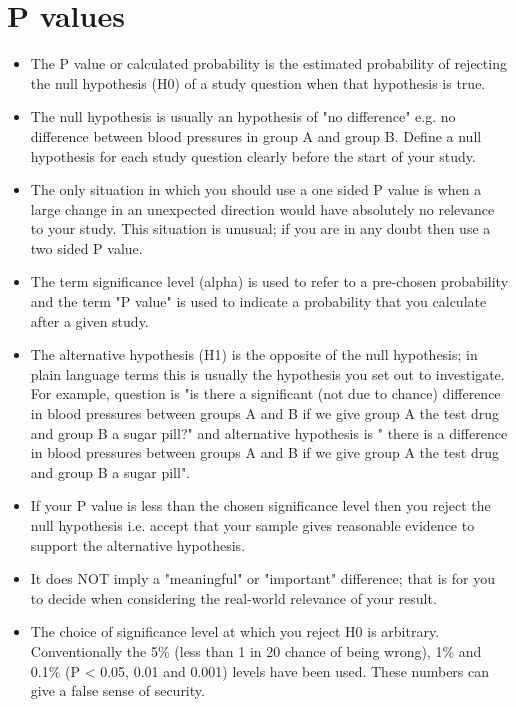 \documentclass[]{report}
\begin{document}
	
\section{P values}

\begin{itemize}
	\item The P value or calculated probability is the estimated probability of rejecting the null hypothesis (H0) of a study question when that hypothesis is true.
	
	\item The null hypothesis is usually an hypothesis of "no difference" e.g. no difference between blood pressures in group A and group B. Define a null hypothesis for each study question clearly before the start of your study.
	
	\item The only situation in which you should use a one sided P value is when a large change in an unexpected direction would have absolutely no relevance to your study. This situation is unusual; if you are in any doubt then use a two sided P value.
	
	\item The term significance level (alpha) is used to refer to a pre-chosen probability and the term "P value" is used to indicate a probability that you calculate after a given study.
	
	\item The alternative hypothesis (H1) is the opposite of the null hypothesis; in plain language terms this is usually the hypothesis you set out to investigate. For example, question is "is there a significant (not due to chance) difference in blood pressures between groups A and B if we give group A the test drug and group B a sugar pill?" and alternative hypothesis is " there is a difference in blood pressures between groups A and B if we give group A the test drug and group B a sugar pill".
	
	
	\item If your P value is less than the chosen significance level then you reject the null hypothesis i.e. accept that your sample gives reasonable evidence to support the alternative hypothesis. \item It does NOT imply a "meaningful" or "important" difference; that is for you to decide when considering the real-world relevance of your result.
	
	\item The choice of significance level at which you reject H0 is arbitrary. Conventionally the 5\% (less than 1 in 20 chance of being wrong), 1\% and 0.1\% (P < 0.05, 0.01 and 0.001) levels have been used. These numbers can give a false sense of security.
\end{itemize} 
\end{document}
